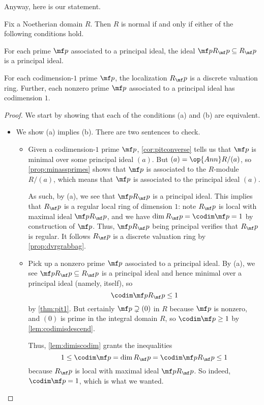 \documentclass[../notes.tex]{subfiles}
\begin{document}
Anyway, here is our statement.
\begin{theorem}
	Fix a Noetherian domain $R$. Then $R$ is normal if and only if either of the following conditions hold.
	\begin{listalph}
		\item For each prime $\mf p$ associated to a principal ideal, the ideal $\mf pR_\mf p\subseteq R_\mf p$ is a principal ideal.
		\item For each codimension-$1$ prime $\mf p$, the localization $R_\mf p$ is a discrete valuation ring. Further, each nonzero prime $\mf p$ associated to a principal ideal has codimension $1$.
	\end{listalph}
\end{theorem}
\begin{proof}
	We start by showing that each of the conditions (a) and (b) are equivalent.
	\begin{itemize}
		\item We show (a) implies (b). There are two sentences to check.
		\begin{itemize}
			\item Given a codimension-$1$ prime $\mf p$, \autoref{cor:pitconverse} tells us that $\mf p$ is minimal over some principal ideal $(a)$. But $(a)=\op{Ann}R/(a)$, so \autoref{prop:minassprimes} shows that $\mf p$ is associated to the $R$-module $R/(a)$, which means that $\mf p$ is associated to the principal ideal $(a)$.

			As such, by (a), we see that $\mf pR_\mf p$ is a principal ideal. This implies that $R_\mf p$ is a regular local ring of dimension $1$: note $R_\mf p$ is local with maximal ideal $\mf pR_\mf p$, and we have $\dim R_\mf p=\codim\mf p=1$ by construction of $\mf p$. Thus, $\mf pR_\mf p$ being principal verifies that $R_\mf p$ is regular. It follows $R_\mf p$ is a discrete valuation ring by \autoref{prop:dvrgrabbag}.

			\item Pick up a nonzero prime $\mf p$ associated to a principal ideal. By (a), we see $\mf pR_\mf p\subseteq R_\mf p$ is a principal ideal and hence minimal over a principal ideal (namely, itself), so
			\[\codim\mf pR_\mf p\le1\]
			by \autoref{thm:pit1}. But certainly $\mf p\supsetneq(0)$ in $R$ because $\mf p$ is nonzero, and $(0)$ is prime in the integral domain $R$, so $\codim\mf p\ge1$ by \autoref{lem:codimisdescend}.
			
			Thus, \autoref{lem:dimiscodim} grants the inequalities
			\[1\le\codim\mf p=\dim R_\mf p=\codim\mf pR_\mf p\le1\]
			because $R_\mf p$ is local with maximal ideal $\mf pR_\mf p$. So indeed, $\codim\mf p=1$, which is what we wanted.
		\end{itemize}


\end{itemize}
\end{proof}
\end{document}
